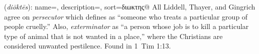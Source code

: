 \item[Exterminator,]

(\textit{diōktēs}):
{
    name=,
    description={},
    sort=διωκτης@
}
All Liddell, Thayer, and Gingrich agree on \emph{persecutor} which defines as ``someone who treats a particular group of people cruelly.'' Also, \emph{exterminator} as ``a person whose job is to kill a particular type of animal that is not wanted in a place,'' where the Christians are considered unwanted pestilence.
Found in 1~Tim 1:13.
